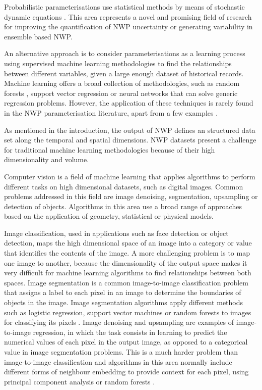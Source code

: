 \documentclass[twocol]{ametsoc}
\begin{document}
Probabilistic parameterisations use statistical methods by means of stochastic dynamic equations \citep{berner2017stochastic}. This area represents a novel and promising field of research for improving the quantification of NWP uncertainty or generating variability in ensemble based NWP.

An alternative approach is to consider parameterisations as a learning process using supervised machine learning methodologies to find the relationships between different variables, given a large enough dataset of historical records. Machine learning offers a broad collection of methodologies, such as random forests \citep{breiman2001random}, support vector regression or neural networks that can solve generic regression problems. However, the application of these techniques is rarely found in the NWP parameterisation literature, apart from a few examples \citep{lipponen2013correction}.

As mentioned in the introduction, the output of NWP defines an structured data set along the temporal and spatial dimensions. NWP datasets present a challenge for traditional machine learning methodologies because of their high dimensionality and volume. 

Computer vision is a field of machine learning that applies algorithms to perform different tasks on high dimensional datasets, such as digital images. Common problems addressed in this field are image denoising, segmentation, upsampling or detection of objects. Algorithms in this area use a broad range of approaches based on the application of geometry, statistical or physical models. 

Image classification, used in applications such as face detection or object detection, maps the high dimensional space of an image into a category \citep{haralick1973textural} or value \citep{takeda2007kernel} that identifies the contents of the image. A more challenging problem is to map one image to another, because the dimensionality of the output space makes it very difficult for machine learning algorithms to find relationships between both spaces. Image segmentation is a common image-to-image classification problem that assigns a label to each pixel in an image to determine the boundaries of objects in the image. Image segmentation algorithms apply different methods such as logistic regression, support vector machines or random forests to images for classifying its pixels \citep{haralick1985image,pal1993review,pal2005random}. Image denoising and upsampling are examples of image-to-image regression, in which the task consists in learning to predict the numerical values of each pixel in the output image, as opposed to a categorical value in image segmentation problems. This is a much harder problem than image-to-image classification and algorithms in this area normally include different forms of neighbour embedding to provide context for each pixel, using principal component analysis or random forests \citep{chang2004super,schulter2015fast}.
\end{document}
